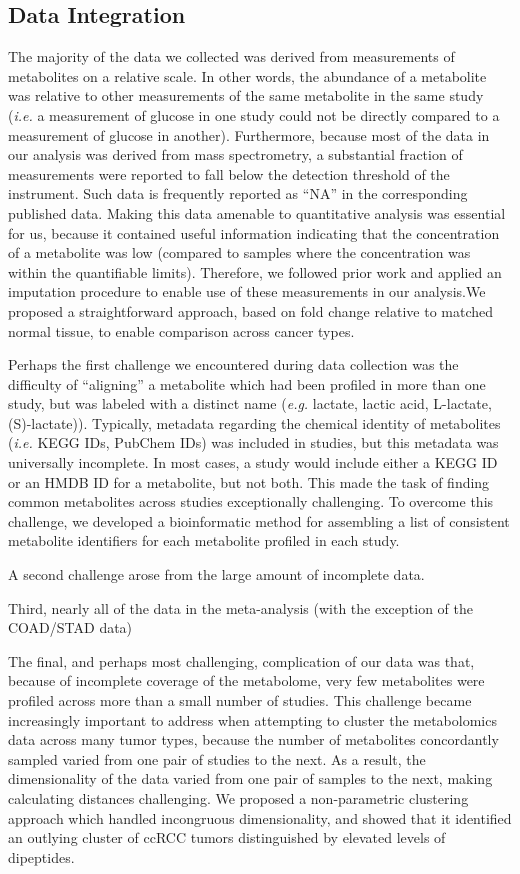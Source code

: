 \documentclass[10pt]{article}
\begin{document}
\subsection{Data Integration}
The majority of the data we collected was derived from measurements of metabolites on a relative scale. In other words, the  abundance of a metabolite was relative to other measurements of the same metabolite in the same study (\textit{i.e.} a measurement of glucose in one study could not be directly compared to a measurement of glucose in another). Furthermore, because most of the data in our analysis was derived from mass spectrometry, a substantial fraction of measurements were reported to fall below the detection threshold of the instrument. Such data is frequently reported as ``NA'' in the corresponding published data. Making this data amenable to quantitative analysis was essential for us, because it contained useful information indicating that the concentration of a metabolite was low (compared to samples where the concentration was within the quantifiable limits). Therefore, we followed prior work and applied an imputation procedure to enable use of these measurements in our analysis.We proposed a straightforward approach, based on fold change relative to matched normal tissue, to enable comparison across cancer types. 

Perhaps the first challenge we encountered during data collection was the difficulty of ``aligning'' a metabolite which had been profiled in more than one study, but was labeled with a distinct name (\textit{e.g.} lactate, lactic acid, L-lactate, (S)-lactate)). Typically, metadata regarding the chemical identity of metabolites (\textit{i.e.} KEGG IDs, PubChem IDs) was included in studies, but this metadata was universally incomplete. In most cases, a study would include either a KEGG ID or an HMDB ID for a metabolite, but not both. This made the task of finding common metabolites across studies exceptionally challenging. To overcome this challenge, we developed a bioinformatic method for assembling a list of consistent metabolite identifiers for each metabolite profiled in each study.

A second challenge arose from the large amount of incomplete data. 

Third, nearly all of the data in the meta-analysis (with the exception of the COAD/STAD data) 

The final, and perhaps most challenging, complication of our data was that, because of incomplete coverage of the metabolome, very few metabolites were profiled across more than a small number of studies. This challenge became increasingly important to address when attempting to cluster the metabolomics data across many tumor types, because the number of metabolites concordantly sampled varied from one pair of studies to the next. As a result, the dimensionality of the data varied from one pair of samples to the next, making calculating distances challenging. We proposed a non-parametric clustering approach which handled incongruous dimensionality, and showed that it identified an outlying cluster of ccRCC tumors distinguished by elevated levels of dipeptides.
\end{document}
